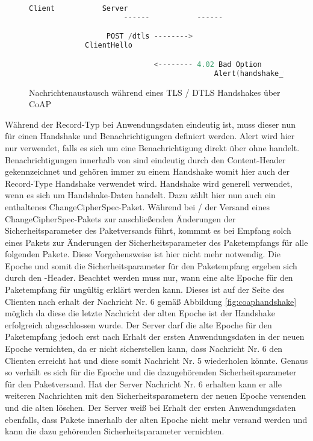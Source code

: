 {\begin{figure}[ht]
  \centering
  \begin{lstlisting}[language=c]
                      Client           Server
                      ------           ------

                  POST /dtls -------->
             ClientHello

                             <-------- 4.02 Bad Option
                                           Alert(handshake_failure)
  \end{lstlisting}
  \caption{Nachrichtenaustausch während eines TLS / DTLS Handshakes über CoAP}
  \label{fig:coaphandshakefail}
\end{figure}

Während der Record-Typ bei Anwendungsdaten eindeutig ist, muss dieser nun für einen Handshake und Benachrichtigungen definiert werden.
Alert wird hier nur verwendet, falls es sich um eine Benachrichtigung direkt über  ohne  handelt.
Benachrichtigungen innerhalb von  sind eindeutig durch den Content-Header gekennzeichnet und gehören immer zu einem Handshake
womit hier auch der Record-Type Handshake verwendet wird. Handshake wird generell verwendet, wenn es sich um Handshake-Daten handelt.
Dazu zählt hier nun auch ein enthaltenes ChangeCipherSpec-Paket. Während bei / der Versand eines ChangeCipherSpec-Pakets
zur anschließenden Änderungen der Sicherheitsparameter des Paketversands führt, kommmt es bei Empfang solch eines Pakets zur Änderungen der
Sicherheitsparameter des Paketempfangs für alle folgenden Pakete. Diese Vorgehensweise ist hier nicht mehr notwendig. Die Epoche und somit
die Sicherheitsparameter für den Paketempfang ergeben sich durch den -Header. Beachtet werden muss nur, wann eine alte Epoche
für den Paketempfang für ungültig erklärt werden kann. Dieses ist auf der Seite des Clienten nach erhalt der Nachricht Nr. 6 gemäß Abbildung
\ref{fig:coaphandshake} möglich da diese die letzte Nachricht der alten Epoche ist der Handshake erfolgreich abgeschlossen wurde.
Der Server darf die alte Epoche für den Paketempfang jedoch erst nach Erhalt der ersten Anwendungsdaten in der neuen Epoche vernichten, da
er nicht sicherstellen kann, dass Nachricht Nr. 6 den Clienten erreicht hat und diese somit Nachricht Nr. 5 wiederholen könnte.
Genaus so verhält es sich für die Epoche und die dazugehörenden Sicherheitsparameter für den Paketversand. Hat der Server Nachricht Nr. 6
erhalten kann er alle weiteren Nachrichten mit den Sicherheitsparametern der neuen Epoche versenden und die alten löschen. Der Server
weiß bei Erhalt der ersten Anwendungsdaten ebenfalls, dass Pakete innerhalb der alten Epoche nicht mehr versand werden und kann die
dazu gehörenden Sicherheitsparameter vernichten.

}
